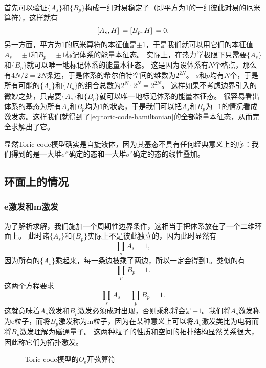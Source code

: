 首先可以验证$\{{A}_s\}$和$\{{B}_p\}$构成一组对易稳定子（即平方为1的一组彼此对易的厄米算符），这样就有
\begin{equation}
    \comm*{{A}_s}{{H}} = \comm*{{B}_p}{{H}} = 0.
\end{equation}
另一方面，平方为1的厄米算符的本征值是$\pm 1$，于是我们就可以用它们的本征值$A_s = \pm 1$和$B_p = \pm 1$标记体系的能量本征态。
实际上，在热力学极限下只需要$\{A_s\}$和$\{B_p\}$就可以唯一地标记体系的能量本征态。
这是因为设体系有$N$个格点，那么有$4N/2=2N$条边，于是体系的希尔伯特空间的维数为$2^{2N}$。%
$s$和$p$均有$N$个，于是所有可能的$\{A_s\}$和$\{B_p\}$的组合总数为$2^N \cdot 2^N=2^{2N}$。
这样如果不考虑边界引入的微妙之处，只需要$\{A_s\}$和$\{B_p\}$就可以唯一地标记体系的能量本征态。
很容易看出体系的基态为所有$A_s$和$B_p$均为$1$的状态，于是我们可以把$A_s$和$B_p$为$-1$的情况看成激发态。这样我们就得到了\eqref{eq:toric-code-hamiltonian}的全部能量本征态，从而完全求解出了它。

显然Toric-code模型确实是自旋液体，因为其基态不具有任何经典意义上的序：我们得到的是一大堆$\sigma^x$确定的态和一大堆$\sigma^z$确定的态的线性叠加。

\subsection{环面上的情况}

\subsubsection{e激发和m激发}

为了解析求解，我们施加一个周期性边界条件，这相当于把体系放在了一个二维环面上。
此时诸$\{A_s\}$和$\{B_p\}$实际上不是彼此独立的，因为此时显然有
\[
    \prod_s {A}_s = 1,
\]
因为所有的$\{A_s\}$乘起来，每一条边被乘了两边，所以一定会得到$1$。类似的有
\[
    \prod_p {B}_p = 1.
\]
这两个方程要求
\begin{equation}
    \prod_{s} A_s = \prod_{p} B_p = 1.
    \label{eq:toric-code-pair-condition}
\end{equation}
这就意味着$A_s$激发和$B_p$激发必须成对出现，否则乘积将会是$-1$。我们将$A_s$激发称为e粒子，而将$B_p$激发称为m粒子，因为在某种意义上可以将$A_s$激发类比为电荷而将$B_p$激发理解为磁通量子。
这两种粒子的性质和空间的拓扑结构显然关系很大，因此称它们为拓扑激发。

\begin{figure}
    \centering
    \caption{Toric-code模型的$O_\text{e}$开弦算符}
\end{figure}


